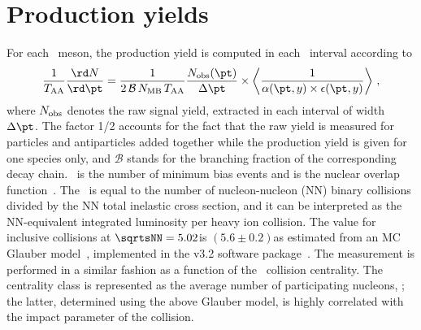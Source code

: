 \section{Production yields}

For each \PB\ meson, the production yield is computed in each \pt\ interval according to
%
\begin{equation}
 \frac{1}{\TAA} \frac{{\rd}N}{{\rd}\pt} =  \frac{1}{2 \, \mathcal{B} \, N_{\text{MB}} \, \TAA}
 \frac{N_{\rm{obs}}(\pt)}{\Delta\pt} 
 \times
\left< \frac{1}{\alpha(\pt, y) \times \epsilon(\pt, y)} \right> \, ,
 \label{eq:xsection}
\end{equation}
%
where $N_{\rm{obs}}$ denotes the raw signal yield, extracted in each \pt interval of width $\Delta \pt$.
%
The factor 1/2 accounts for the fact that the raw yield is measured for particles and antiparticles added together while the production yield is given for one species only, and $\mathcal{B}$ stands for the branching fraction of the corresponding decay chain.
%
\NMB\ is the number of minimum bias events and \TAA is the nuclear overlap function~\cite{glauber2007}. 
The \TAA\ is equal to the number of nucleon-nucleon (NN) binary collisions divided by the NN total inelastic cross section, and it can be interpreted as the NN-equivalent integrated luminosity per heavy ion collision. The \TAA value for inclusive \PbPb collisions at $\sqrtsNN=5.02$\TeV is $(5.6\pm0.2)$\mbinv as estimated from an MC Glauber model~\cite{glauber2007}, implemented in the {} v3.2 software package~\cite{glauber2017}.
The measurement is performed in a similar fashion as a function of the \PbPb\ collision centrality. The centrality class is represented as the average number of participating nucleons, \npart; the latter, determined using the above Glauber model, is highly correlated with the impact parameter of the collision.

